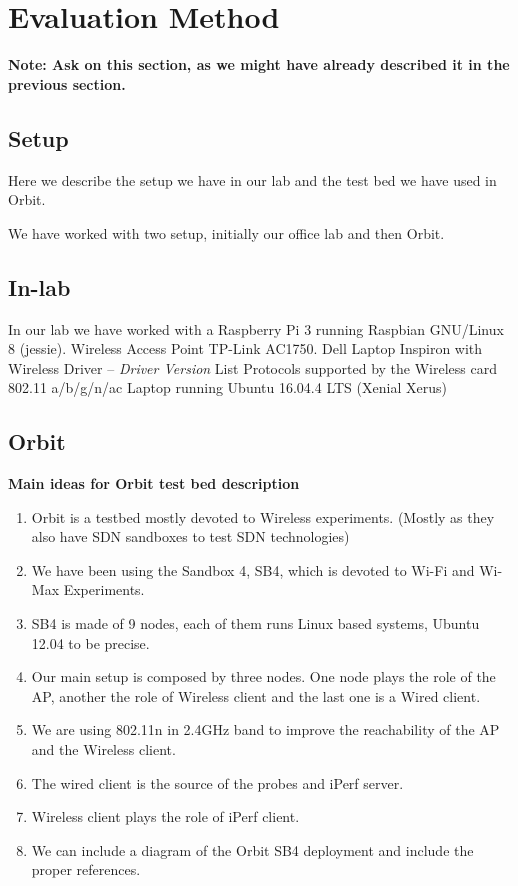 \section{Evaluation Method}\label{Evaluation_Method}

\textbf{Note: Ask on this section, as we might have already described it in the previous section.}

\subsection{Setup}

Here we describe the setup we have in our lab and the test bed we have used in Orbit.

We have worked with two setup, initially our office lab and then Orbit.

\subsection*{In-lab}

In our lab we have worked with a Raspberry Pi 3 running Raspbian GNU/Linux 8 (jessie).
Wireless Access Point TP-Link AC1750.
Dell Laptop Inspiron with Wireless Driver -- \emph{Driver Version}
List Protocols supported by the Wireless card 802.11 a/b/g/n/ac
Laptop running Ubuntu 16.04.4 LTS (Xenial Xerus)

\subsection*{Orbit}


\textbf{Main ideas for Orbit test bed description}

\begin{enumerate}
	\item Orbit is a testbed mostly devoted to Wireless experiments. (Mostly as they also have SDN sandboxes to test SDN technologies)
	\item We have been using the Sandbox 4, SB4, which is devoted to Wi-Fi and Wi-Max Experiments.
	\item SB4 is made of 9 nodes, each of them runs Linux based systems, Ubuntu 12.04 to be precise.
	\item Our main setup is composed by three nodes. One node plays the role of the AP, another the role of Wireless client and the last one is a Wired client.
	\item We are using 802.11n in 2.4GHz band to improve the reachability of the AP and the Wireless client.
	\item The wired client is the source of the probes and iPerf server.
	\item Wireless client plays the role of iPerf client.
	\item We can include a diagram of the Orbit SB4 deployment and include the proper references.
\end{enumerate}

